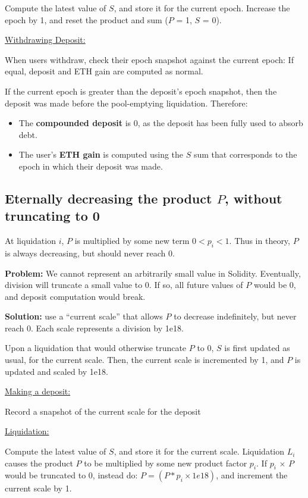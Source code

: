 \documentclass[reqno]{article}
\begin{document}
Compute the latest value of {$S$}, and store it for the current epoch.
Increase the epoch by 1, and reset the product and sum ({$P$} = 1, {$S$} = 0).

\bigskip
\underline{Withdrawing Deposit:}

When users withdraw, check their epoch snapshot against the current epoch: If equal, deposit and ETH gain are computed as normal.

\bigskip
If the current epoch is greater than the deposit’s epoch snapshot, then the deposit was made before the pool-emptying liquidation. Therefore:
\begin{itemize}
    \item The \textbf{compounded deposit} is 0, as the deposit has been fully used to absorb debt.
    \item The user’s \textbf{ETH gain} is computed using the $S$ sum that corresponds to the epoch in which their deposit was made.
\end{itemize}

\bigskip
\subsection{Eternally decreasing the product $P$, without truncating to 0}

\bigskip
At liquidation $i$, $P$ is multiplied by some new term $0 < p_i <1$. Thus in theory, $P$ is always decreasing, but should never reach 0. 

\bigskip
\textbf{Problem:} We cannot represent an arbitrarily small value in Solidity.  Eventually, division will truncate a small value to 0. If so, all future values of $P$ would be 0, and deposit computation would break.

\bigskip
\textbf{Solution:} use a “current scale” that allows $P$ to decrease indefinitely, but never reach 0. Each scale represents a division by 1e18.  

\bigskip
Upon a liquidation that would otherwise truncate $P$ to 0, {$S$} is first updated as usual, for the current scale. Then, the current scale is incremented by 1, and {$P$} is updated and scaled by 1e18.

\bigskip
\underline{Making a deposit:}

Record a snapshot of the current scale for the deposit

\bigskip
\underline{Liquidation:}

Compute the latest value of {$S$}, and store it for the current scale.
Liquidation {$L_i$} causes the product {$P$} to be multiplied by some new product factor {$p_i$}.  If {$p_i$} $\times$ {$P$} would be truncated to 0, instead do: $P = (P * p_i \times 1e18)$, and increment the current scale by 1.
\end{document}
